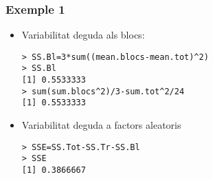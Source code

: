 \documentclass[12pt,t]{beamer}
\theoremstyle{plain}
\theoremstyle{definition}
\begin{document}
\begin{frame}[fragile]
\frametitle{Exemple 1}

\begin{itemize}

\item Variabilitat deguda als blocs:
\begin{verbatim}
> SS.Bl=3*sum((mean.blocs-mean.tot)^2)
> SS.Bl
[1] 0.5533333
> sum(sum.blocs^2)/3-sum.tot^2/24
[1] 0.5533333
\end{verbatim}
\medskip

\item Variabilitat   deguda a factors aleatoris
\begin{verbatim}
> SSE=SS.Tot-SS.Tr-SS.Bl
> SSE
[1] 0.3866667
\end{verbatim}
\end{itemize}

\end{frame}
\end{document}
